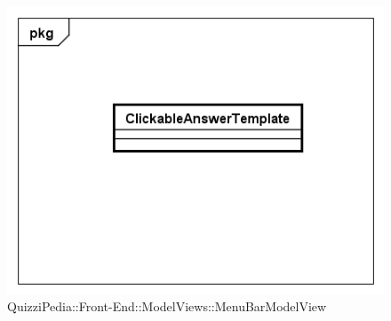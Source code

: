 \label{QuizziPedia::Front-End::ModelViews::MenuBarModelView}

\begin{figure}[ht]
	\centering
	\includegraphics[scale=0.5,keepaspectratio]{UML/Classi/Front-End/QuizziPedia_Front-end_Templates_ClickableAnswerTemplate.png}
	\caption{QuizziPedia::Front-End::ModelViews::MenuBarModelView}
\end{figure} \FloatBarrier

